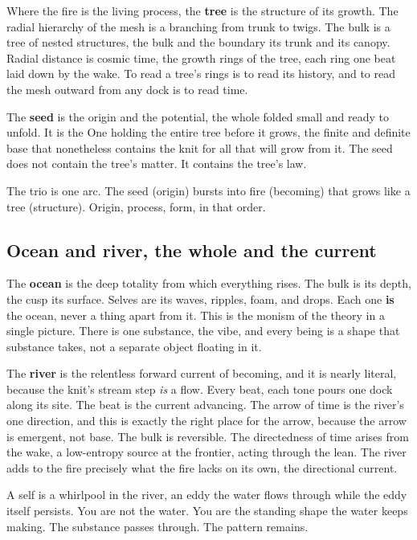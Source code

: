 Where the fire is the living process, the \textbf{tree} is the structure of its growth. The radial hierarchy of the mesh is a branching from trunk to twigs. The bulk is a tree of nested structures, the bulk and the boundary its trunk and its canopy. Radial distance is cosmic time, the growth rings of the tree, each ring one beat laid down by the wake. To read a tree's rings is to read its history, and to read the mesh outward from any dock is to read time.

The \textbf{seed} is the origin and the potential, the whole folded small and ready to unfold. It is the One holding the entire tree before it grows, the finite and definite base that nonetheless contains the knit for all that will grow from it. The seed does not contain the tree's matter. It contains the tree's law.

The trio is one arc. The seed (origin) bursts into fire (becoming) that grows like a tree (structure). Origin, process, form, in that order.

\subsection{Ocean and river, the whole and the current}

The \textbf{ocean} is the deep totality from which everything rises. The bulk is its depth, the cusp its surface. Selves are its waves, ripples, foam, and drops. Each one \textbf{is} the ocean, never a thing apart from it. This is the monism of the theory in a single picture. There is one substance, the vibe, and every being is a shape that substance takes, not a separate object floating in it.

The \textbf{river} is the relentless forward current of becoming, and it is nearly literal, because the knit's stream step \emph{is} a flow. Every beat, each tone pours one dock along its site. The beat is the current advancing. The arrow of time is the river's one direction, and this is exactly the right place for the arrow, because the arrow is emergent, not base. The bulk is reversible. The directedness of time arises from the wake, a low-entropy source at the frontier, acting through the lean. The river adds to the fire precisely what the fire lacks on its own, the directional current.

\begin{result}
A self is a whirlpool in the river, an eddy the water flows through while the eddy itself persists. You are not the water. You are the standing shape the water keeps making. The substance passes through. The pattern remains.
\end{result}


